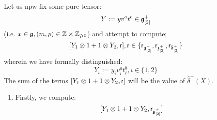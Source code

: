 \begin{remark}
\begin{enumerate}
                    Let us npw fix some pure tensor:
                        $$Y := y v^a t^b \in \mathfrak{g}_{[2]}^+$$
                    (i.e. $x \in \g, (m, p) \in \Z \x \Z_{\geq 0}$) and attempt to compute:
                        $$[Y_1 \tensor 1 + 1 \tensor Y_2, \sfr], \sfr \in \{ \sfr_{\g_{[2]}^+}, \sfr_{\z_{[2]}^+}, \sfr_{\bar{\d}_{[2]}^+} \}$$
                    wherein we have formally distinguished:
                        $$Y_i := y_i v_i^a t_i^b, i \in \{1, 2\}$$
                    The sum of the terms $[Y_1 \tensor 1 + 1 \tensor Y_2, \sfr]$ will be the value of $\hat{\delta}^+(X)$. 
                    \begin{enumerate}
                        \item Firstly, we compute:
                            $$[Y_1 \tensor 1 + 1 \tensor Y_2, \sfr_{\g_{[2]}^+}]$$
                            

\end{enumerate}
\end{enumerate}
\end{remark}
